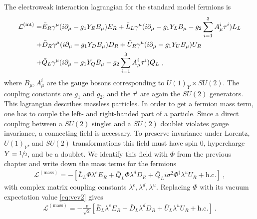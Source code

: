 The electroweak interaction lagrangian for the standard model fermions is
\begin{align}\label{eq:LFermion}
	\mathcal{L}^{(\text{int})} = &\bar{E}_R\gamma^\mu(i\partial_\mu-g_1Y_EB_\mu)E_R + \bar{L}_L\gamma^\mu(i\partial_\mu-g_1Y_LB_\mu-g_2\sum_{i=1}^{3}A_\mu^i\tau^i)L_L \notag \\
	+ &\bar{D}_R\gamma^\mu(i\partial_\mu-g_1Y_DB_\mu)D_R + \bar{U}_R\gamma^\mu(i\partial_\mu-g_1Y_UB_\mu)U_R \notag \\
	+ &\bar{Q}_L\gamma^\mu(i\partial_\mu-g_1Y_QB_\mu-g_2\sum_{i=1}^{3}A_\mu^i\tau^i)Q_L \ ,
\end{align}
where $B_\mu, A_\mu^i$ are the gauge bosons corresponding to $U(1)_Y\times SU(2)$. The coupling constants are $g_1$ and $g_2$, and the $\tau^i$ are again the $SU(2)$ generators. This lagrangian describes massless particles. In order to get a fermion mass term, one has to couple the left- and right-handed part of a particle. Since a direct coupling between a $SU(2)$ singlet and a $SU(2)$ doublet violates gauge invariance, a connecting field is necessary. To preserve invariance under Lorentz, $U(1)_Y$, and $SU(2)$ transformations this field must have spin 0, hypercharge $Y=\sfrac{1}{2}$, and be a doublet. We identify this field with $\Phi$ from the previous chapter and write down the mass terms for the fermions
\begin{align}
	\mathcal{L}^{(\text{mass})} = -\left[\bar{L}_L\Phi\lambda^e  E_R  + \bar{Q}_L\Phi\lambda^d D_R + \bar{Q}_Li\sigma^2\Phi^\dagger\lambda^u U_R + \text{h.c.}\right] \ ,
\end{align}
with complex matrix coupling constants $\lambda^e,\lambda^d,\lambda^u$. Replacing $\Phi$ with its vacuum expectation value \eqref{eq:vev2} gives
\begin{align}\label{eq:LMass}
	\mathcal{L}^{(\text{mass})} = -\frac{v}{\sqrt{2}}\left[ \bar{E}_L\lambda^e E_R  + \bar{D}_L \lambda^dD_R + \bar{U}_L\lambda^u U_R + \text{h.c.}\right] \ .
\end{align}



